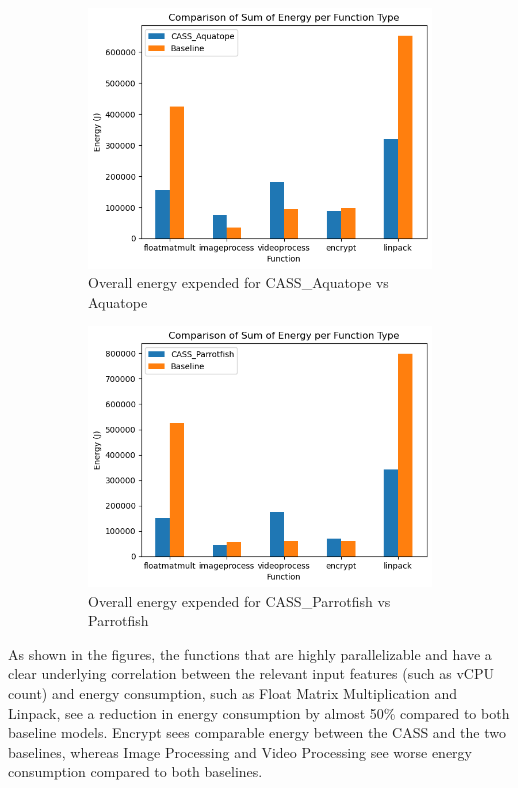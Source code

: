 \documentclass[times, 10pt,twocolumn]{article}
\begin{document}
\begin{figure}[h] %
   \centering
   \begin{subfigure}[b]{0.5\textwidth} %
         \centering
         \includegraphics[width=0.6\linewidth]{imgs/final_experiment_plots/energy_comparison/aquatope/overall.png}
         \caption{Overall energy expended for CASS\_Aquatope vs Aquatope}
         \label{fig:cassvsaquatope_energy}
   \end{subfigure}
   \begin{subfigure}[b]{0.5\textwidth} %
         \centering
         \includegraphics[width=0.6\linewidth]{imgs/final_experiment_plots/energy_comparison/parrotfish/overall.png}
         \caption{Overall energy expended for CASS\_Parrotfish vs Parrotfish}
         \label{fig:cassvsparrotfish_energy}
   \end{subfigure}
   \caption{}
\end{figure}

As shown in the figures, the functions that are highly parallelizable and have a clear underlying correlation between the relevant input features (such as vCPU count) and energy consumption, such as Float Matrix Multiplication and Linpack, see a reduction in energy consumption by almost 50\% compared to both baseline models. Encrypt sees comparable energy between the CASS and the two baselines, whereas Image Processing and Video Processing see worse energy consumption compared to both baselines.
\end{document}
